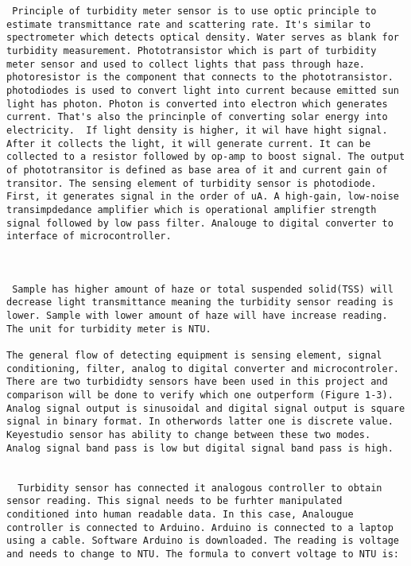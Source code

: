 \documentclass[]{article}
\begin{document}
\begin{verbatim}
 Principle of turbidity meter sensor is to use optic principle to estimate transmittance rate and scattering rate. It's similar to spectrometer which detects optical density. Water serves as blank for turbidity measurement. Phototransistor which is part of turbidity meter sensor and used to collect lights that pass through haze. photoresistor is the component that connects to the phototransistor. photodiodes is used to convert light into current because emitted sun light has photon. Photon is converted into electron which generates current. That's also the princinple of converting solar energy into electricity.  If light density is higher, it wil have hight signal. After it collects the light, it will generate current. It can be collected to a resistor followed by op-amp to boost signal. The output of phototransitor is defined as base area of it and current gain of transitor. The sensing element of turbidity sensor is photodiode. First, it generates signal in the order of uA. A high-gain, low-noise transimpdedance amplifier which is operational amplifier strength signal followed by low pass filter. Analouge to digital converter to interface of microcontroller. 
 
 

 Sample has higher amount of haze or total suspended solid(TSS) will decrease light transmittance meaning the turbidity sensor reading is lower. Sample with lower amount of haze will have increase reading. The unit for turbidity meter is NTU.
 
The general flow of detecting equipment is sensing element, signal conditioning, filter, analog to digital converter and microcontroler. There are two turbididty sensors have been used in this project and comparison will be done to verify which one outperform (Figure 1-3). Analog signal output is sinusoidal and digital signal output is square signal in binary format. In otherwords latter one is discrete value. Keyestudio sensor has ability to change between these two modes. Analog signal band pass is low but digital signal band pass is high.   


  Turbidity sensor has connected it analogous controller to obtain sensor reading. This signal needs to be furhter manipulated conditioned into human readable data. In this case, Analougue controller is connected to Arduino. Arduino is connected to a laptop using a cable. Software Arduino is downloaded. The reading is voltage and needs to change to NTU. The formula to convert voltage to NTU is: 
 
\end{verbatim}
\end{document}
